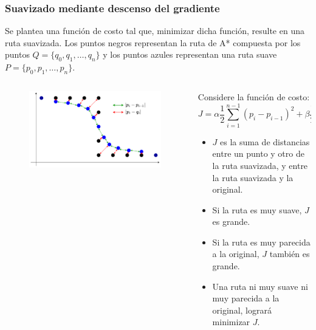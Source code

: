 \begin{frame}\frametitle{Suavizado mediante descenso del gradiente}
  Se plantea una función de costo tal que, minimizar dicha función, resulte en una ruta suavizada. Los puntos negros representan la ruta de A* compuesta por los puntos $Q=\{q_0, q_1, \dots, q_n\}$ y los puntos azules representan una ruta suave $P=\{p_0, p_1,\dots, p_n\}$.
  \begin{columns}
    \begin{column}{0.5\textwidth}
      \begin{figure}
        \centering
        \includegraphics[width=\textwidth]{Figures/MotionPlanning/PathSmoothing.pdf}
      \end{figure}
    \end{column}
    \begin{column}{0.5\textwidth}
      Considere la función de costo:
      \[J = \alpha\frac{1}{2}\sum_{i=1}^{n-1}\left(p_i - p_{i-1}\right)^2 + \beta\frac{1}{2}\sum_{i=1}^{n-1}(p_i - q_i)^2\]
      \begin{itemize}
      \item $J$ es la suma de distancias entre un punto y otro de la ruta suavizada, y entre la ruta suavizada y la original.
      \item Si la ruta es muy suave, $J$ es grande.
      \item Si la ruta es muy parecida a la original, $J$ también es grande.
      \item Una ruta ni muy suave ni muy parecida a la original, logrará minimizar $J$.
      \end{itemize}
    \end{column}
  \end{columns}
\end{frame}

